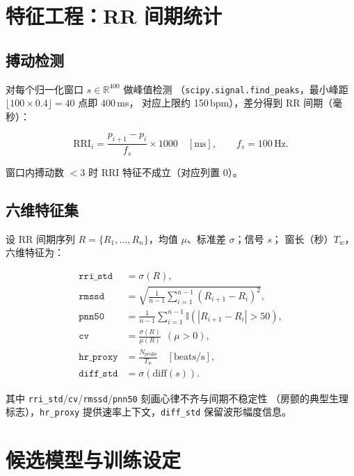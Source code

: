 \documentclass[11pt,a4paper]{ctexart}
\newcommand{\RRI}{\mathrm{RRI}}
\newcommand{\feat}[1]{\texttt{#1}}
\begin{document}
\section{特征工程：RR 间期统计}
\label{sec:features}

\subsection{搏动检测}
\label{sec:beat-detect}

对每个归一化窗口 $s\in\mathbb{R}^{400}$ 做峰值检测
（\feat{scipy.signal.find\_peaks}，最小峰距 $\lfloor 100\times 0.4\rfloor=40$ 点即 400\,ms，
对应上限约 150\,bpm），差分得到 RR 间期（毫秒）：

\begin{equation}
  \RRI_i = \frac{p_{i+1}-p_i}{f_s}\times 1000 \quad [\mathrm{ms}],\qquad f_s=100\,\mathrm{Hz}.
  \label{eq:rri}
\end{equation}

窗口内搏动数 $<3$ 时 RRI 特征不成立（对应列置 0）。

\subsection{六维特征集}
\label{sec:feature-def}

设 RR 间期序列 $R=\{R_1,\dots,R_n\}$，均值 $\mu$、标准差 $\sigma$；信号 $s$；
窗长（秒）$T_w$，六维特征为：

\begin{align}
  \feat{rri\_std} &= \sigma(R), \label{eq:f1}\\
  \feat{rmssd} &= \sqrt{\frac{1}{n-1}\sum_{i=1}^{n-1}\left(R_{i+1}-R_i\right)^2}, \label{eq:f2}\\
  \feat{pnn50} &= \frac{1}{n-1}\sum_{i=1}^{n-1}\mathbb{I}\!\left(\left|R_{i+1}-R_i\right|>50\right), \label{eq:f3}\\
  \feat{cv} &= \frac{\sigma(R)}{\mu(R)}\ \ (\mu>0), \label{eq:f4}\\
  \feat{hr\_proxy} &= \frac{N_{\mathrm{peaks}}}{T_w} \quad [\mathrm{beats/s}], \label{eq:f5}\\
  \feat{diff\_std} &= \sigma\!\left(\mathrm{diff}(s)\right). \label{eq:f6}
\end{align}

其中 \feat{rri\_std}/\feat{cv}/\feat{rmssd}/\feat{pnn50} 刻画心律不齐与间期不稳定性
（房颤的典型生理标志），\feat{hr\_proxy} 提供速率上下文，\feat{diff\_std} 保留波形幅度信息。

\section{候选模型与训练设定}
\label{sec:models}
\end{document}

